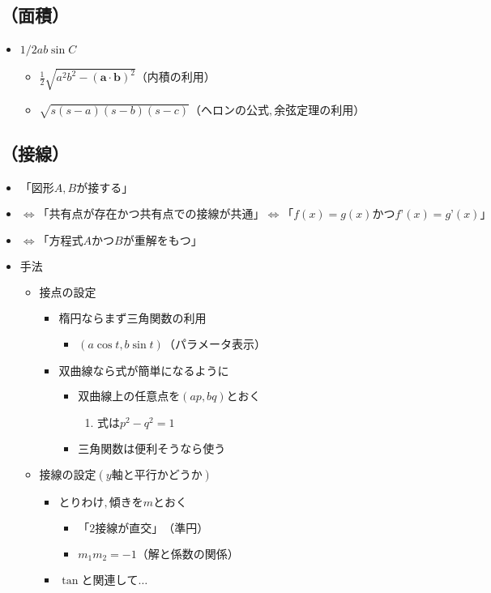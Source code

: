 \documentclass[dvipdfmx,uplatex]{jsarticle}
\begin{document}
\subsection{（面積）}
\begin{itemize}
	\item $ 1/2ab \sin C$
	\begin{itemize}
		\item $ \frac{1}{2} \sqrt{a^2b^2 - (\bm{a} \cdot \bm{b})^2} （内積の利用）$
		\item $ \sqrt{s(s-a)(s-b)(s-c)} （ヘロンの公式,余弦定理の利用）$
	\end{itemize}
\end{itemize}
\subsection{（接線）}
\begin{itemize}
	\item $ 「図形A,Bが接する」$
	\item $ \Leftrightarrow「共有点が存在かつ共有点での接線が共通」⇔「f(x) = g(x) かつ f’(x) = g’(x)」$
	\item $ \Leftrightarrow「方程式AかつBが重解をもつ」$
	\item $ 手法$
	\begin{itemize}
		\item $ 接点の設定$
		\begin{itemize}
			\item $ 楕円ならまず三角関数の利用$
			\begin{itemize}
				\item $ (a\cos t, b\sin t)（パラメータ表示）$
			\end{itemize}
			\item $ 双曲線なら式が簡単になるように$
			\begin{itemize}
				\item $ 双曲線上の任意点を(ap, bq)とおく$
				\begin{enumerate}
					\item $ 式はp^2 - q^2 = 1$
				\end{enumerate}
				\item $ 三角関数は便利そうなら使う$
			\end{itemize}
		\end{itemize}
		\item $ 接線の設定 (y軸と平行かどうか)$
		\begin{itemize}
			\item $ とりわけ,傾きをmとおく$
			\begin{itemize}
				\item $ 「2接線が直交」（準円）$
				\item $ m_1m_2 = -1（解と係数の関係）$
			\end{itemize}
			\item $ \tan と関連して…$
		\end{itemize}
	\end{itemize}
\end{itemize}
\end{document}
